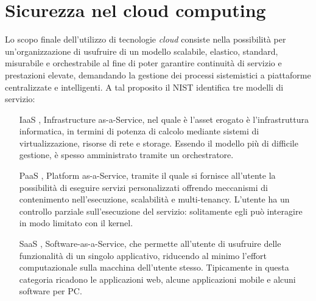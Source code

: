 \documentclass[../main.tex]{subfiles}
\begin{document}
\section{Sicurezza nel cloud computing}
Lo scopo finale dell'utilizzo di tecnologie \textit{cloud} consiste nella possibilità per un'organizzazione di usufruire di un modello scalabile, elastico, standard, misurabile e orchestrabile al fine di poter garantire continuità di servizio e prestazioni elevate, demandando la gestione dei processi sistemistici a piattaforme centralizzate e intelligenti.
A tal proposito il NIST\cite{NISTCloud} identifica tre modelli di servizio:
\begin{itemize}
    \item[IaaS], Infrastructure as-a-Service, nel quale è l'asset erogato è l'infrastruttura informatica, in termini di potenza di calcolo mediante sistemi di virtualizzazione, risorse di rete e storage. Essendo il modello più di difficile gestione, è spesso amministrato tramite un orchestratore.
    \item[PaaS], Platform as-a-Service, tramite il quale si fornisce all'utente la possibilità di eseguire servizi personalizzati offrendo meccanismi di contenimento nell'esecuzione, scalabilità e multi-tenancy. L'utente ha un controllo parziale sull'esecuzione del servizio: solitamente egli può interagire in modo limitato con il kernel.
    \item[SaaS], Software-as-a-Service, che permette all'utente di usufruire delle funzionalità di un singolo applicativo, riducendo al minimo l'effort computazionale sulla macchina dell'utente stesso. Tipicamente in questa categoria ricadono le applicazioni web, alcune applicazioni mobile e alcuni software per PC.
\end{itemize}
\end{document}
